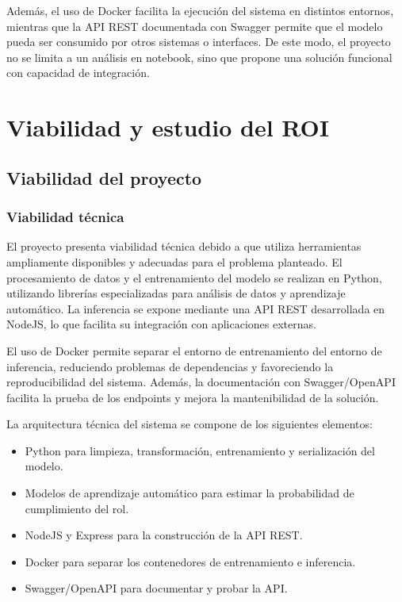 \documentclass{ULBreport} %
\begin{document}
Además, el uso de Docker facilita la ejecución del sistema en distintos entornos, mientras que la API REST documentada con Swagger permite que el modelo pueda ser consumido por otros sistemas o interfaces. De este modo, el proyecto no se limita a un análisis en notebook, sino que propone una solución funcional con capacidad de integración.

\section{Viabilidad y estudio del ROI}

\subsection{Viabilidad del proyecto}

\subsubsection{Viabilidad técnica}

El proyecto presenta viabilidad técnica debido a que utiliza herramientas ampliamente disponibles y adecuadas para el problema planteado. El procesamiento de datos y el entrenamiento del modelo se realizan en Python, utilizando librerías especializadas para análisis de datos y aprendizaje automático. La inferencia se expone mediante una API REST desarrollada en NodeJS, lo que facilita su integración con aplicaciones externas.

El uso de Docker permite separar el entorno de entrenamiento del entorno de inferencia, reduciendo problemas de dependencias y favoreciendo la reproducibilidad del sistema. Además, la documentación con Swagger/OpenAPI facilita la prueba de los endpoints y mejora la mantenibilidad de la solución.

La arquitectura técnica del sistema se compone de los siguientes elementos:

\begin{itemize}
    \item Python para limpieza, transformación, entrenamiento y serialización del modelo.
    \item Modelos de aprendizaje automático para estimar la probabilidad de cumplimiento del rol.
    \item NodeJS y Express para la construcción de la API REST.
    \item Docker para separar los contenedores de entrenamiento e inferencia.
    \item Swagger/OpenAPI para documentar y probar la API.
\end{itemize}
\end{document}
